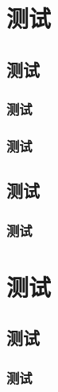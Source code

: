 \chapter{测试}


\zhlipsum[1]


\section{测试}


\zhlipsum[2-3]


\subsection{测试}


\zhlipsum[3-5]


\subsection{测试}


\zhlipsum[3]


\section{测试}


\zhlipsum[2]


\subsection{测试}


\zhlipsum[3]

\chapter{测试}


\zhlipsum[4]


\section{测试}


\zhlipsum[5]


\subsection{测试}


\zhlipsum[6]


